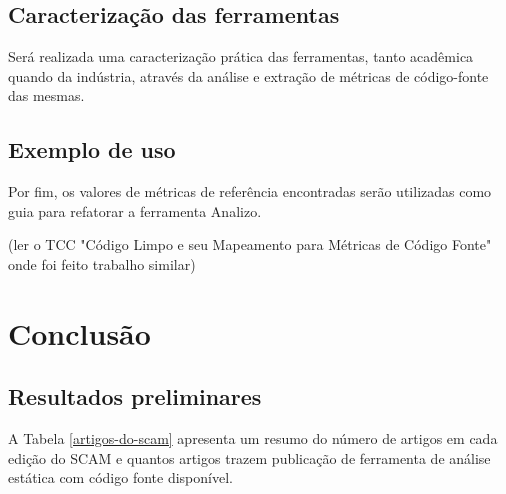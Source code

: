 \documentclass[qual, classic, a4paper]{ufbathesis}
\begin{document}
\section{Caracterização das ferramentas}

Será realizada uma caracterização prática das ferramentas, tanto acadêmica
quando da indústria, através da análise e extração de métricas de código-fonte
das mesmas.


\section{Exemplo de uso}

Por fim, os valores de métricas de referência encontradas serão utilizadas
como guia para refatorar a ferramenta Analizo.

(ler o TCC "Código Limpo e seu Mapeamento para Métricas de Código Fonte" onde
foi feito trabalho similar)

\chapter{Conclusão}

\section{Resultados preliminares}\label{resultados}

A Tabela \ref{artigos-do-scam} apresenta um resumo do número de artigos em
cada edição do SCAM e quantos artigos trazem publicação de ferramenta de análise
estática com código fonte disponível.
\end{document}

